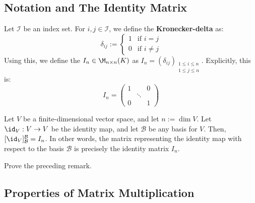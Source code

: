 \subsection{Notation and The Identity Matrix}

Let $\mathcal{I}$ be an index set. For $i, j \in \mathcal{I}$, we define the \textbf{Kronecker-delta} as:
\begin{equation*}
    \delta_{ij} := \begin{cases} 1 & \text{if } i = j \\ 0 & \text{if } i \neq j \end{cases}
\end{equation*}
Using this, we define the  $I_n \in \M_{n \times n}(K)$ as $I_n = (\delta_{ij})_{\substack{1 \le i \le n \\ 1 \le j \le n}}$. Explicitly, this is:
\begin{equation*}
    I_n = \begin{pmatrix} 1 & & 0 \\ & \ddots & \\ 0 & & 1 \end{pmatrix}
\end{equation*}

\begin{remark}
Let $V$ be a finite-dimensional vector space, and let $n := \dim V$. Let $\id_V: V \to V$ be the identity map, and let $\mathcal{B}$ be any basis for $V$. Then, $[\id_V]_{\mathcal{B}}^{\mathcal{B}} = I_n$. In other words, the matrix representing the identity map with respect to the basis $\mathcal{B}$ is precisely the identity matrix $I_n$.
\end{remark}

\begin{exercise}
Prove the preceding remark.
\end{exercise}

\subsection{Properties of Matrix Multiplication}

